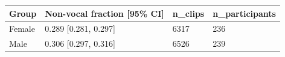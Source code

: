 \begin{tabular}{llll}
\toprule
Group & Non-vocal fraction [95\% CI] & n\_clips & n\_participants \\
\midrule
Female & 0.289 [0.281, 0.297] & 6317 & 236 \\
Male & 0.306 [0.297, 0.316] & 6526 & 239 \\
\bottomrule
\end{tabular}
